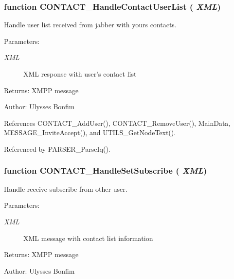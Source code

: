 \subsubsection[CONTACT\_\-HandleContactUserList]{\setlength{\rightskip}{0pt plus 5cm}function CONTACT\_\-HandleContactUserList ( {\em XML})}\label{contact_2contact_8js_26ae1bd15b5e682bb84d20d89e6011fc}


Handle user list received from jabber with yours contacts. 

\begin{Desc}
\item[Parameters:]
\begin{description}
\item[{\em XML}]XML response with user's contact list \end{description}
\end{Desc}
\begin{Desc}
\item[Returns:]XMPP message \end{Desc}
\begin{Desc}
\item[Author:]Ulysses Bonfim \end{Desc}


References CONTACT\_\-AddUser(), CONTACT\_\-RemoveUser(), MainData, MESSAGE\_\-InviteAccept(), and UTILS\_\-GetNodeText().

Referenced by PARSER\_\-ParseIq().
\subsubsection[CONTACT\_\-HandleSetSubscribe]{\setlength{\rightskip}{0pt plus 5cm}function CONTACT\_\-HandleSetSubscribe ( {\em XML})}\label{contact_2contact_8js_6c6f87e02cfdde7f7166a53b1852c74b}


Handle receive subscribe from other user. 

\begin{Desc}
\item[Parameters:]
\begin{description}
\item[{\em XML}]XML message with contact list information \end{description}
\end{Desc}
\begin{Desc}
\item[Returns:]XMPP message \end{Desc}
\begin{Desc}
\item[Author:]Ulysses Bonfim \end{Desc}


